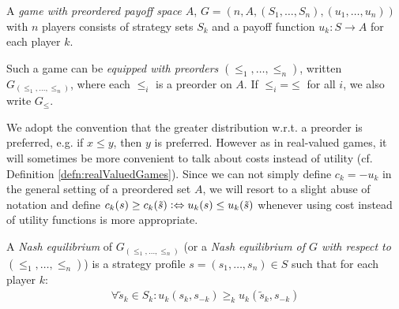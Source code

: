 \documentclass[a4paper]{scrreprt}
\begin{document}
    \let\popref\geq
    \let\pononpref\leq
    \let\postrpref>
    \let\postrnonpref<    

    \begin{defn}
        A \emph{game with preordered payoff space $A$}, $G = (n, A, (S_1, \dots, S_n), (u_1, \dots, u_n))$ with $n$ players consists of strategy sets $S_k$ and a payoff function $u_k: S \to A$ for each player $k$.
        
        Such a game can be \emph{equipped with preorders} $(\leq_1, \dots, \leq_n)$, written $G_{(\leq_1, \dots, \leq_n)}$, where each $\leq_i$ is a preorder on $A$.
        If $\leq_i \mathbin{=} \leq$ for all $i$, we also write $G_\leq$.
    \end{defn}
    We adopt the convention that the greater distribution w.r.t. a preorder is preferred, e.g. if $x \leq y$, then $y$ is preferred. However as in real-valued games, it will sometimes be more convenient to talk about costs instead of utility (cf. Definition \ref{defn:realValuedGames}). Since we can not simply define $c_k = -u_k$ in the general setting of a preordered set $A$, we will resort to a slight abuse of notation and define $c_k(s) \popref c_k(\tilde{s}) \colonlra u_k(s) \pononpref u_k(\tilde{s})$ whenever using cost instead of utility functions is more appropriate.
    
    \begin{defn}
        A \emph{Nash equilibrium} of $G_{(\leq_1, \dots, \leq_n)}$ (or a \emph{Nash equilibrium of $G$ with respect to $(\leq_1, \dots, \leq_n)$})
        is a strategy profile $s = (s_1, \dots, s_n) \in S$ such that for each player $k$:
        \begin{gather}
            \forall \tilde{s}_k \in S_k: u_k(s_k, s_{-k}) \popref_k u_k(\tilde{s}_k, s_{-k})
            \label{eq:nashEquilibriumPreorderedPayoffs}
        \end{gather}
    \end{defn}
    
\end{document}

